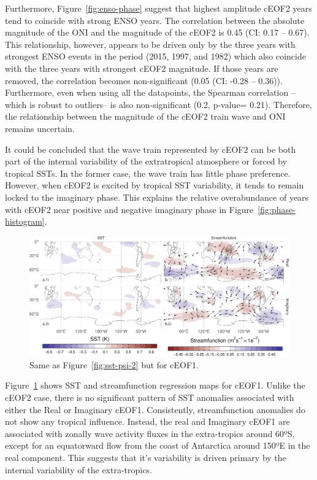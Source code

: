\documentclass[smallextended]{svjour3}       %
\begin{document}
Furthermore, Figure~\ref{fig:enso-phase} suggest that highest amplitude cEOF2 years tend to coincide with strong ENSO years.
The correlation between the absolute magnitude of the ONI and the magnitude of the cEOF2 is 0.45 (CI: 0.17 -- 0.67).
This relationship, however, appears to be driven only by the three years with strongest ENSO events in the period (2015, 1997, and 1982) which also coincide with the three years with strongest cEOF2 magnitude.
If those years are removed, the correlation becomes non-significant (0.05 (CI: -0.28 -- 0.36)).
Furthermore, even when using all the datapoints, the Spearman correlation --which is robust to outliers-- is also non-significant (0.2, p-value= 0.21).
Therefore, the relationship between the magnitude of the cEOF2 train wave and ONI remains uncertain.

It could be concluded that the wave train represented by cEOF2 can be both part of the internal variability of the extratropical atmosphere or forced by tropical SSTs.
In the former case, the wave train has little phase preference.
However, when cEOF2 is excited by tropical SST variability, it tends to remain locked to the imaginary phase.
This explains the relative overabundance of years with cEOF2 near positive and negative imaginary phase in Figure~\ref{fig:phase-histogram}.



\begin{figure}
\includegraphics{../figures/sst-psi-1-1} \caption{Same as Figure~\ref{fig:sst-psi-2} but for cEOF1.}\label{fig:sst-psi-1}
\end{figure}

Figure~\ref{fig:sst-psi-1} shows SST and streamfunction regression maps for cEOF1.
Unlike the cEOF2 case, there is no significant pattern of SST anomalies associated with either the Real or Imaginary cEOF1.
Consistently, streamfunction anomalies do not show any tropical influence.
Instead, the real and Imaginary cEOF1 are associated with zonally wave activity fluxes in the extra-tropics around 60ºS, except for an equatorward flow from the coast of Antarctica around 150ºE in the real component.
This suggests that it's variability is driven primary by the internal variability of the extra-tropics.
\end{document}
